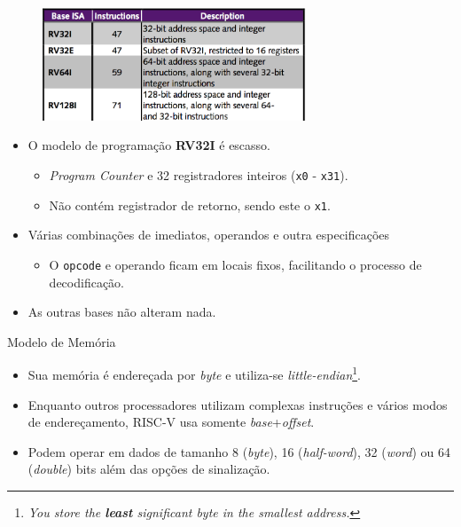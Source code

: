 \documentclass[red, aspectratio=169, xcolor=dvipsnames]{beamer}
\let\olditem=\item%
\renewcommand{\item}{\olditem \justifying}
\begin{document}
\begin{frame}[plain]%
	\begin{figure}
		\centering
		\label{fig:bi2}
		\includegraphics[width=0.7\textwidth]{img/base-instruction-a.png}
	\end{figure}
	\begin{itemize}
		\item O modelo de programação \textbf{RV32I} é escasso.
		\begin{itemize}
			\item \textit{Program Counter} e 32 registradores inteiros (\texttt{x0} - \texttt{x31}).
			\item Não contém registrador de retorno, sendo este o \texttt{x1}.
		\end{itemize}
		\item Várias combinações de imediatos, operandos e outra especificações
		\begin{itemize}
			\item O \texttt{opcode} e operando ficam em locais fixos, facilitando o processo de decodificação.
		\end{itemize}
		\item As outras bases não alteram nada.
	\end{itemize}
\end{frame}

\begin{frame}{Modelo de Memória}
	\begin{itemize}
		\setlength{\itemsep}{1.5em}
		\item Sua memória é endereçada por \textit{byte} e utiliza-se \textit{little-endian}\footnote{\textit{You store the \textbf{least} significant byte in the smallest address.}}.
		\item Enquanto outros processadores utilizam complexas instruções e vários modos de endereçamento, RISC-V usa somente \textit{base}+\textit{offset}.
		\item Podem operar em dados de tamanho 8 (\textit{byte}), 16 (\textit{half-word}), 32 (\textit{word}) ou 64 (\textit{double}) bits além das opções de sinalização.
	\end{itemize}
\end{frame}
\end{document}
